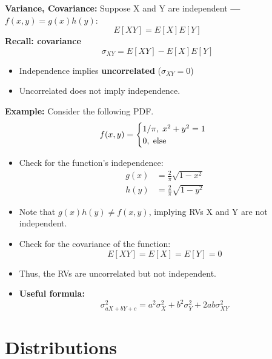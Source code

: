 \documentclass[10pt, letterpaper, twoside]{article}
\begin{document}
\begin{multicols}{2}
\textbf{Variance, Covariance:} Suppose X and Y are independent \textbf{---} $f(x,y) = g(x)h(y)$:
\begin{equation*}
    E[XY] = E[X]E[Y]
\end{equation*}
\textbf{Recall: covariance}
\begin{equation*}
    \sigma_{XY} = E[XY] - E[X]E[Y]
\end{equation*}
\begin{itemize}
    \item Independence implies \textbf{uncorrelated} ($\sigma_{XY} = 0$)
    \item Uncorrelated does not imply independence.
\end{itemize}
\textbf{Example:} Consider the following PDF.
\begin{equation*}
    f(x,y) =
    \begin{cases}
        1/\pi, \hspace{0.1cm} x^2 + y^2 = 1 \\
        0, \hspace{0.1cm} \text{else}
    \end{cases}
\end{equation*}
\begin{itemize}
    \item Check for the function's independence:
    \begin{align*}
        g(x) &= \frac{2}{\pi}\sqrt{1-x^2}\\
        h(y) &= \frac{2}{\pi}\sqrt{1-y^2}
    \end{align*}
    \item Note that $g(x)h(y) \neq f(x,y)$, implying RVs X and Y are not independent.
    \item Check for the covariance of the function:
    \begin{equation*}
        E[XY] = E[X] = E[Y] = 0
    \end{equation*}
    \item Thus, the RVs are uncorrelated but not independent.
    \item \textbf{Useful formula:}
    \begin{equation*}
        \sigma^2_{aX+bY+c} = a^2\sigma_X^2 + b^2\sigma_Y^2 + 2ab\sigma^2_{XY}
    \end{equation*}
\end{itemize}
\vfill\pagebreak

\section{Distributions}


\end{multicols}
\end{document}

